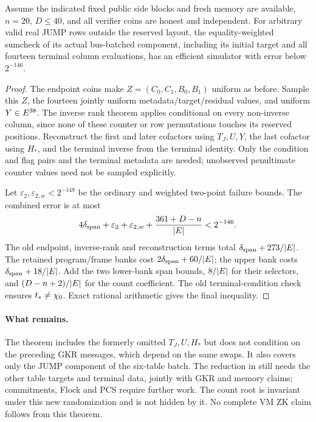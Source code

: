 \begin{theorem}
Assume the indicated fixed public side blocks and fresh memory are available, $n=20$, $D\le40$, and all verifier coins are honest and independent. For arbitrary valid real JUMP rows outside the reserved layout, the equality-weighted sumcheck of its actual bus-batched component, including its initial target and all fourteen terminal column evaluations, has an efficient simulator with error below $2^{-146}$.
\end{theorem}
\begin{proof}
The endpoint coins make $Z=(C_0,C_1,B_0,B_1)$ uniform as before. Sample this $Z$, the fourteen jointly uniform metadata/target/residual values, and uniform $Y\in E^{38}$. The inverse rank theorem applies conditional on every non-inverse column, since none of these counter or row permutations touches its reserved positions. Reconstruct the first and later cofactors using $T_J,U,Y$, the last cofactor using $H_*$, and the terminal inverse from the terminal identity. Only the condition and flag pairs and the terminal metadata are needed; unobserved penultimate counter values need not be sampled explicitly.

Let $\varepsilon_2,\varepsilon_{2,w}<2^{-148}$ be the ordinary and weighted two-point failure bounds. The combined error is at most
\[
 4\delta_{\mathrm{span}}+\varepsilon_2+\varepsilon_{2,w}
       +\frac{361+D-n}{|E|}<2^{-146}.
\]
The old endpoint, inverse-rank and reconstruction terms total $\delta_{\mathrm{span}}+273/|E|$. The retained program/frame banks cost $2\delta_{\mathrm{span}}+60/|E|$; the upper bank costs $\delta_{\mathrm{span}}+18/|E|$. Add the two lower-bank span bounds, $8/|E|$ for their selectors, and $(D-n+2)/|E|$ for the count coefficient. The old terminal-condition check ensures $t_*\ne\chi_0$. Exact rational arithmetic gives the final inequality.
\end{proof}

\paragraph{What remains.} The theorem includes the formerly omitted $T_J,U,H_*$ but does not condition on the preceding GKR messages, which depend on the same swaps. It also covers only the JUMP component of the six-table batch. The reduction in  still needs the other table targets and terminal data, jointly with GKR and memory claims; commitments, Flock and PCS require further work. The count root is invariant under this new randomization and is not hidden by it. No complete VM ZK claim follows from this theorem.

